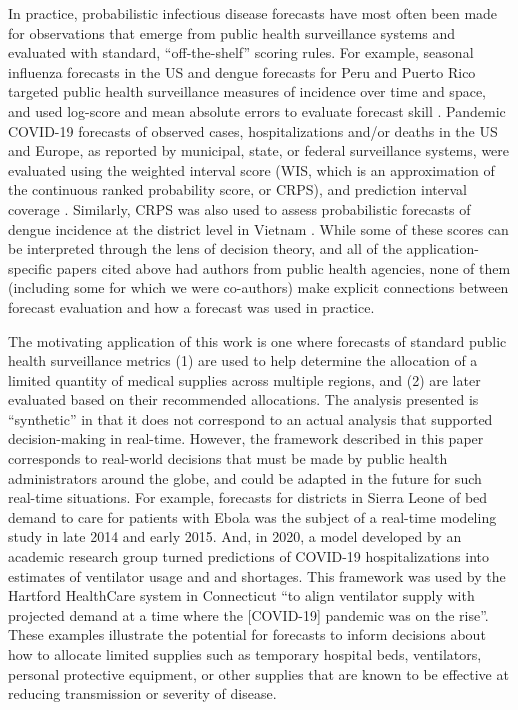 \documentclass{article}
\begin{document}
In practice, probabilistic infectious disease forecasts have most often been made for observations that emerge from public health surveillance systems and evaluated with standard, ``off-the-shelf'' scoring rules.
For example, seasonal influenza forecasts in the US and dengue forecasts for Peru and Puerto Rico targeted public health surveillance measures of incidence over time and space, and used log-score and mean absolute errors to evaluate forecast skill \citep{mcgowan_collaborative_2019,reich_collaborative_2019,johansson_open_2019}.
Pandemic COVID-19 forecasts of observed cases, hospitalizations and/or deaths in the US and Europe, as reported by municipal, state, or federal surveillance systems, were evaluated using the weighted interval score (WIS, which is an approximation of the continuous ranked probability score, or CRPS), and prediction interval coverage \citep{cramer_evaluation_2022,fox_real-time_2022,sherratt2023predictive}.
Similarly, CRPS was also used to assess probabilistic forecasts of dengue incidence at the district level in Vietnam \citep{colon-gonzalez_probabilistic_2021}.
While some of these scores can be interpreted through the lens of decision theory, and all of the application-specific papers cited above had authors from public health agencies, none of them (including some for which we were co-authors) make explicit connections between forecast evaluation and how a forecast was used in practice.

The motivating application of this work is one where forecasts of standard public health surveillance metrics (1) are used to help determine the allocation of a limited quantity of medical supplies across multiple regions, and (2) are later evaluated based on their recommended allocations.  
The analysis presented is ``synthetic'' in that it does not correspond to an actual analysis that supported decision-making in real-time.
However, the framework described in this paper corresponds to real-world decisions that must be made by public health administrators around the globe, and could be adapted in the future for such real-time situations.  
For example, forecasts for districts in Sierra Leone of bed demand to care for patients with Ebola was the subject of a real-time modeling study in late 2014 and early 2015\cite{camacho2015-ebola-bed}.
And, in 2020, a model developed by an academic research group turned predictions of COVID-19 hospitalizations into estimates of ventilator usage and and shortages. This framework was used by the Hartford HealthCare system in Connecticut ``to align ventilator supply with projected demand at a time where the [COVID-19] pandemic was on the rise''\cite{bertsimas2021predictionsCOVID}. 
These examples illustrate the potential for forecasts to inform decisions about how to allocate limited supplies such as temporary hospital beds, ventilators, personal protective equipment, or other supplies that are known to be effective at reducing transmission or severity of disease.
\end{document}
